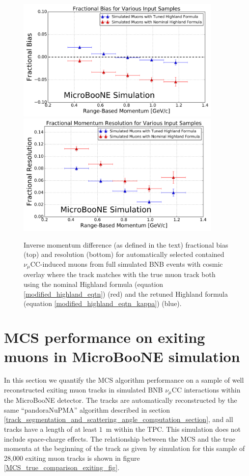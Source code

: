 \documentclass[a4paper,11pt]{article}
\begin{document}
\begin{figure}
\centering
	\includegraphics[width=0.9\textwidth]{Figures/MCS_range_bias_compareHighlandTuning_publicplot.png}
	\includegraphics[width=0.9\textwidth]{Figures/MCS_range_resolution_compareHighlandTuning_publicplot.png}
\caption{Inverse momentum difference (as defined in the text) fractional bias (top) and resolution (bottom) for automatically selected contained $\nu_\mu$CC-induced muons from full simulated BNB events with cosmic overlay where the track matches with the true muon track both using the nominal Highland formula (equation \ref{modified_highland_eqtn}) (red) and the retuned Highland formula (equation \ref{modified_highland_eqtn_kappa}) (blue).}\label{MCS_range_bias_resolution_compareHighlandFormulas_fig}
\end{figure}






\section{MCS performance on exiting muons in MicroBooNE simulation}
In this section we quantify the MCS algorithm performance on a sample of well reconstructed exiting muon tracks in simulated BNB $\nu_\mu$CC interactions within the MicroBooNE detector. The tracks are automatically reconstructed by the same ``pandoraNuPMA'' algorithm described in section \ref{track_segmentation_and_scattering_angle_computation_section}, and all tracks have a length of at least $1$~m within the TPC. This simulation does not include space-charge effects. The relationship between the MCS and the true momenta at the beginning of the track as given by simulation for this sample of 28,000 exiting muon tracks is shown in figure \ref{MCS_true_comparison_exiting_fig}.\\
\end{document}
